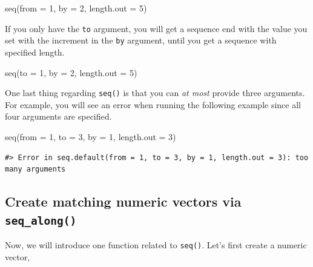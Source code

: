 \documentclass[
]{book}
\newenvironment{Shaded}{\begin{snugshade}}{\end{snugshade}}
\newcommand{\AttributeTok}[1]{\textcolor[rgb]{0.77,0.63,0.00}{#1}}
\newcommand{\DecValTok}[1]{\textcolor[rgb]{0.00,0.00,0.81}{#1}}
\newcommand{\FunctionTok}[1]{\textcolor[rgb]{0.00,0.00,0.00}{#1}}
\newcommand{\NormalTok}[1]{#1}
\begin{document}
\begin{Shaded}
\begin{Highlighting}[]
\FunctionTok{seq}\NormalTok{(}\AttributeTok{from =} \DecValTok{1}\NormalTok{, }\AttributeTok{by =} \DecValTok{2}\NormalTok{, }\AttributeTok{length.out =} \DecValTok{5}\NormalTok{)}
\end{Highlighting}
\end{Shaded}

If you only have the \texttt{to} argument, you will get a sequence end with the value you set with the increment in the \texttt{by} argument, until you get a sequence with specified length.

\begin{Shaded}
\begin{Highlighting}[]
\FunctionTok{seq}\NormalTok{(}\AttributeTok{to =} \DecValTok{1}\NormalTok{, }\AttributeTok{by =} \DecValTok{2}\NormalTok{, }\AttributeTok{length.out =} \DecValTok{5}\NormalTok{)}
\end{Highlighting}
\end{Shaded}

One last thing regarding \texttt{seq()} is that you can \emph{at most} provide three arguments. For example, you will see an error when running the following example since all four arguments are specified.

\begin{Shaded}
\begin{Highlighting}[]
\FunctionTok{seq}\NormalTok{(}\AttributeTok{from =} \DecValTok{1}\NormalTok{, }\AttributeTok{to =} \DecValTok{3}\NormalTok{, }\AttributeTok{by =} \DecValTok{1}\NormalTok{, }\AttributeTok{length.out =} \DecValTok{3}\NormalTok{)}
\end{Highlighting}
\end{Shaded}

\begin{verbatim}
#> Error in seq.default(from = 1, to = 3, by = 1, length.out = 3): too many arguments
\end{verbatim}

\hypertarget{create-matching-numeric-vectors-via-seq_along}{%
\subsection{\texorpdfstring{Create matching numeric vectors via \texttt{seq\_along()}}{Create matching numeric vectors via seq\_along()}}\label{create-matching-numeric-vectors-via-seq_along}}

Now, we will introduce one function related to \texttt{seq()}. Let's first create a numeric vector,
\end{document}
